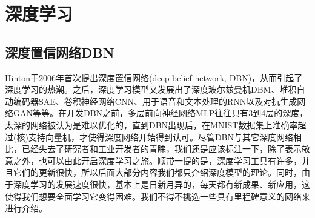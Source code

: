 % 
\chapter{深度学习}
\section{深度置信网络DBN}
    \par
    Hinton于2006年首次提出深度置信网络(deep belief network, DBN)，从而引起了深度学习的热潮。之后，深度学习模型又发展出了深度玻尔兹曼机DBM、堆积自动编码器SAE、卷积神经网络CNN、用于语音和文本处理的RNN以及对抗生成网络GAN等等。在开发DBN之前，多层前向神经网络MLP往往只有3到4层的深度，太深的网络被认为是难以优化的，直到DBN出现后，在MNIST数据集上准确率超过(核)支持向量机，才使得深度网络开始得到认可。尽管DBN与其它深度网络相比，已经失去了研究者和工业开发者的青睐，我们还是应该标注一下，除了表示敬意之外，也可以由此开启深度学习之旅。顺带一提的是，深度学习工具有许多，并且它们的更新很快，所以后面大部分内容我们都只介绍深度模型的理论。同时，由于深度学习的发展速度很快，基本上是日新月异的，每天都有新成果、新应用，这使得我们想要全面学习它变得困难。我们不得不挑选一些具有里程碑意义的网络来进行介绍。
